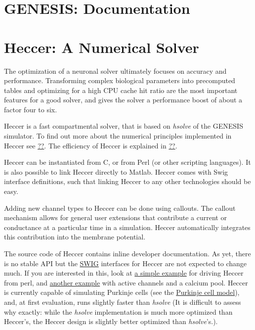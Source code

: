 \documentclass[12pt]{article}
\begin{document}
\section*{GENESIS: Documentation}

\section*{Heccer: A Numerical Solver}

%

%

The optimization of a neuronal solver ultimately focuses on accuracy and performance. Transforming complex biological parameters into precomputed tables and optimizing for a high CPU cache hit ratio are the most important features for a good solver, and gives the solver a performance boost of about a factor four to six.

Heccer is a fast compartmental solver, that is based on {\it hsolve} of the GENESIS simulator. To find out more about the numerical principles implemented in Heccer see \href{}{??}. The efficiency of Heccer is explained in \href{}{??}.

Heccer can be instantiated from C, or from Perl (or other scripting languages). It is also possible to link Heccer directly to Matlab. Heccer comes with Swig interface definitions, such that linking Heccer to any other technologies should be easy.

Adding new channel types to Heccer can be done using callouts. The callout mechanism allows for general user extensions that contribute a current or conductance at a particular time in a simulation. Heccer automatically integrates this contribution into the membrane potential.

The source code of Heccer contains inline developer documentation. As yet, there is no stable API but the \href{http://www.swig.org/}{SWIG} interfaces for Heccer are not expected to change much. If you are interested in this, look at \href{}{a simple example} for driving Heccer from perl, and \href{}{another example} with active channels and a calcium pool. Heccer is currently capable of simulating Purkinje cells (see the \href{../purkinje-cell-model/purkinje-cell-model.tex}{Purkinje cell model}), and, at first evaluation, runs slightly faster than {\it hsolve} (It is difficult to assess why exactly: while the {\it hsolve} implementation is much more optimized than Heccer's, the Heccer design is slightly better optimized than {\it hsolve}'s.).
\end{document}
